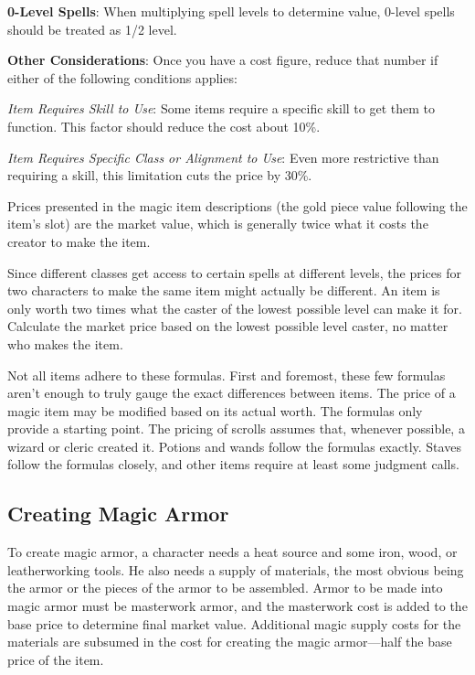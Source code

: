 \textbf{0-Level Spells}: When multiplying spell levels to determine value, 0-level spells should be treated as 1/2 level.
				
\textbf{Other Considerations}: Once you have a cost figure, reduce that number if either of the following conditions applies:
				
\textit{Item Requires Skill to Use}: Some items require a specific skill to get them to function. This factor should reduce the cost about 10\%.
				
\textit{Item Requires Specific Class or Alignment to Use}: Even more restrictive than requiring a skill, this limitation cuts the price by 30\%.
				
Prices presented in the magic item descriptions (the gold piece value following the item's slot) are the market value, which is generally twice what it costs the creator to make the item.
				
Since different classes get access to certain spells at different levels, the prices for two characters to make the same item might actually be different. An item is only worth two times what the caster of the lowest possible level can make it for. Calculate the market price based on the lowest possible level caster, no matter who makes the item.
				
Not all items adhere to these formulas. First and foremost, these few formulas aren't enough to truly gauge the exact differences between items. The price of a magic item may be modified based on its actual worth. The formulas only provide a starting point. The pricing of scrolls assumes that, whenever possible, a wizard or cleric created it. Potions and wands follow the formulas exactly. Staves follow the formulas closely, and other items require at least some judgment calls.
				
\subsection{Creating Magic Armor}

				
To create magic armor, a character needs a heat source and some iron, wood, or leatherworking tools. He also needs a supply of materials, the most obvious being the armor or the pieces of the armor to be assembled. Armor to be made into magic armor must be masterwork armor, and the masterwork cost is added to the base price to determine final market value. Additional magic supply costs for the materials are subsumed in the cost for creating the magic armor---half the base price of the item.
				
